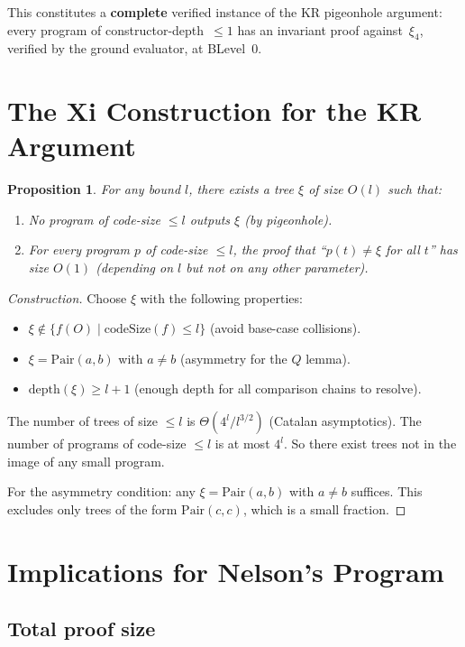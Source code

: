 \documentclass[11pt]{article}
\newtheorem{proposition}[theorem]{Proposition}
\begin{document}
This constitutes a \textbf{complete} verified instance of the KR pigeonhole argument:
every program of constructor-depth~$\leq 1$ has an invariant proof against~$\xi_4$,
verified by the ground evaluator, at BLevel~0.

\section{The Xi Construction for the KR Argument}

\begin{proposition}
For any bound $l$, there exists a tree $\xi$ of size $O(l)$ such that:
\begin{enumerate}
\item No program of code-size $\leq l$ outputs $\xi$ (by pigeonhole).
\item For every program $p$ of code-size $\leq l$, the proof that
  ``$p(t) \neq \xi$ for all $t$'' has size $O(1)$ (depending on $l$ but not on any other parameter).
\end{enumerate}
\end{proposition}

\begin{proof}[Construction]
Choose $\xi$ with the following properties:
\begin{itemize}
\item $\xi \notin \{f(O) \mid \mathrm{codeSize}(f) \leq l\}$ (avoid base-case collisions).
\item $\xi = \mathrm{Pair}(a, b)$ with $a \neq b$ (asymmetry for the $Q$ lemma).
\item $\mathrm{depth}(\xi) \geq l + 1$ (enough depth for all comparison chains to resolve).
\end{itemize}

The number of trees of size $\leq l$ is $\Theta(4^l / l^{3/2})$ (Catalan asymptotics).
The number of programs of code-size $\leq l$ is at most $4^l$.
So there exist trees not in the image of any small program.

For the asymmetry condition: any $\xi = \mathrm{Pair}(a, b)$ with $a \neq b$ suffices.
This excludes only trees of the form $\mathrm{Pair}(c, c)$, which is a small fraction.
\end{proof}

\section{Implications for Nelson's Program}

\subsection{Total proof size}
\end{document}
